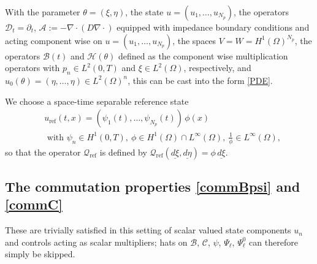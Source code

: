 \documentclass[12pt]{article}
\newcommand\uld[1]{\underline{d#1}}
\newcommand\DD{\mathcal{D}}
\newcommand\calA{\mathcal{A}}
\newcommand\BB{\mathcal{B}}
\newcommand\HH{\mathcal{H}}
\newcommand\hrefprime{\mathcal{Q}_{\text{ref}}}
\newcommand\pot{\xi}
\newcommand\init{\eta}
\newcommand\contr{p}
\newcommand\Ncont{N_p}
\begin{document}
With the parameter $\theta=(\pot,\init)$, the state $u=(u_1,\ldots,u_{\Ncont})$, the operators $\DD_t=\partial_t$, $\calA:=-\nabla\cdot (D\nabla \cdot)$ equipped with impedance boundary conditions and acting component wise on $u=(u_1,\ldots,u_{\Ncont})$, the spaces $V=W=H^1(\Omega)^{\Ncont}$, the operators $\BB(t)$ and $\HH(\theta)$ defined as the component wise multiplication operators with $\contr_n\in L^2(0,T)$ and $\pot\in L^2(\Omega)$, respectively,
and $u_0(\theta)=(\init,\ldots,\init)\in L^2(\Omega)^n$,  
this can be cast into the form \eqref{PDE}. 

We choose a space-time separable reference state 
\begin{equation}\label{uref_diffusion}
\begin{aligned}
&u_{\text{ref}}(t,x)=(\psi_1(t),\ldots,\psi_{\Ncont}(t))\,\phi(x)\\
&\text{ with }
\psi_n\in H^1(0,T), \ \phi\in H^1(\Omega)\cap L^\infty(\Omega), \ \tfrac{1}{\phi}\in L^\infty(\Omega),
\end{aligned}
\end{equation} 
so that the operator $\hrefprime$ is defined by $\hrefprime(\uld{\pot},\uld{\init})=\phi\,\uld{\pot}$. 

\subsection{The commutation properties \eqref{commBpsi} and \eqref{commC}} 
\label{subsec:comm_diffusion}
These are trivially satisfied in this setting of  scalar valued state components $u_n$ and controls acting as scalar multipliers; hats on $\BB$, $\mathcal{C}$, $\psi$, $\Psi_\ell$, $\Psi_\ell^0$ can therefore simply be skipped.
\end{document}

